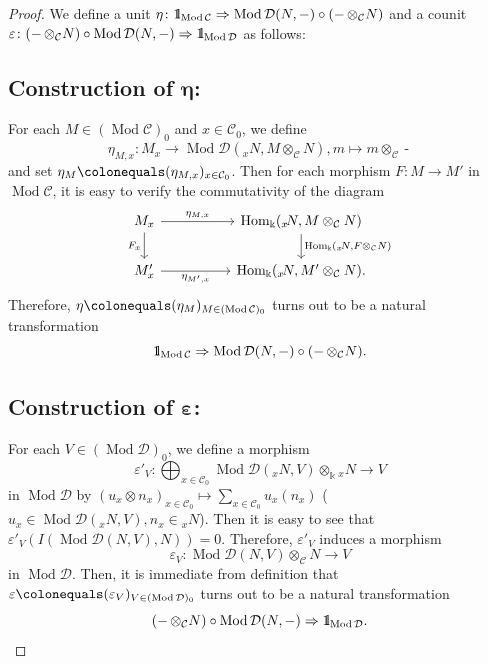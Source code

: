 \documentclass{surv-l}
\numberwithin{equation}{chapter}
\numberwithin{figure}{chapter}
\theoremstyle{plain}
\theoremstyle{definition}
\theoremstyle{remark}
\newcommand{\id}{1\kern-.25em{\text{{\rm l}}}}
\newcommand{\llow}[1]{{}_{#1}\!}
\newcommand{\Ar}[3]{\ar[from={#1}, to={#2}, #3]}
\DeclareMathOperator{\Hom}{Hom}
\DeclareMathOperator{\Mod}{Mod}
\DeclareMathOperator{\blank}{-}
\begin{document}
\begin{proof}
We define a unit $\eta \colon \id_{\Mod{\mathcal{C}}} \Rightarrow \Mod{\mathcal{D}}(N,\blank) \circ (\blank \otimes_{\mathcal{C}} N)$
and a counit $\varepsilon \colon (\blank \otimes_{\mathcal{C}} N) \circ \Mod{\mathcal{D}}(N,\blank) \Rightarrow \id_{\Mod{\mathcal{D}}}$
as follows:

\subsection*{Construction of $\boldsymbol{\eta}$:}
For each $M \in (\Mod{\mathcal{C}})_0$ and $x \in {\mathcal{C}}_0$, we define
\[
\eta_{M,x} \colon M_x \to \Mod{\mathcal{D}}(\llow{x}N, M\otimes_{\mathcal{C}} N), m \mapsto m \otimes_{\mathcal{C}} \blank
\]
and set $\eta_M\colonequals  (\eta_{M,x})_{x \in {\mathcal{C}}_0}$.
Then for each morphism $F \colon M \to M'$ in $\Mod{\mathcal{C}}$,
it is easy to verify the commutativity of the diagram
\[
\begin{tikzcd}[column sep=5em]
M_x & \Hom_\Bbbk(\llow{x}N, M \otimes_{\mathcal{C}} N)\\
M'_x & \Hom_\Bbbk(\llow{x}N, M' \otimes_{\mathcal{C}} N).
\Ar{1-1}{1-2}{"{\eta_{M,x}}"}
\Ar{2-1}{2-2}{"{\eta_{M',x}}" '}
\Ar{1-1}{2-1}{"F_x"'}
\Ar{1-2}{2-2}{"{\Hom_\Bbbk(\llow{x}N, F \otimes_{\mathcal{C}} N)}"}
\end{tikzcd}
\]
Therefore, $\eta\colonequals  (\eta_M)_{M \in (\Mod{\mathcal{C}})_0}$ turns out to be a natural transformation
\[
\id_{\Mod{\mathcal{C}}} \Rightarrow \Mod{\mathcal{D}}(N,\blank) \circ (\blank \otimes_{\mathcal{C}} N).
\]


\subsection*{Construction of $\boldsymbol{\varepsilon}$:}
For each $V \in (\Mod {\mathcal{D}})_0$, we define a morphism
\[
\varepsilon'_V \colon \bigoplus_{x \in {\mathcal{C}}_0} \Mod{\mathcal{D}}(\llow{x}N, V) \otimes_\Bbbk \llow{x}N \to V
\]
in $\Mod {\mathcal{D}}$
by $(u_x \otimes n_x)_{x \in {\mathcal{C}}_0} \mapsto \sum_{x \in {\mathcal{C}}_0}u_x(n_x)$
($u_x \in \Mod{\mathcal{D}}(\llow{x}N, V), n_x \in \llow{x}N$).
Then it is easy to see that $\varepsilon'_V(I(\Mod{\mathcal{D}}(N, V), N)) = 0$.
Therefore, $\varepsilon'_V$ induces a morphism
\[
\varepsilon_V \colon  \Mod{\mathcal{D}}(N, V) \otimes_{\mathcal{C}} N \to V
\]
in $\Mod {\mathcal{D}}$.
Then, it is immediate from definition that
$\varepsilon\colonequals  (\varepsilon_V)_{V \in (\Mod {\mathcal{D}})_0}$ turns out to be a natural transformation
\[
(\blank \otimes_{\mathcal{C}} N)\circ \Mod{\mathcal{D}}(N, \blank) \Rightarrow \id_{\Mod {\mathcal{D}}}.
\]


\end{proof}
\end{document}
